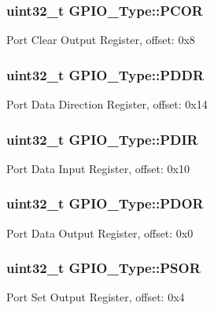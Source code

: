 \subsubsection[{\texorpdfstring{P\+C\+OR}{PCOR}}]{ uint32\+\_\+t G\+P\+I\+O\+\_\+\+Type\+::\+P\+C\+OR}\hypertarget{structGPIO__Type_a6c70e08238cd1fda316a11095b493719}{}\label{structGPIO__Type_a6c70e08238cd1fda316a11095b493719}
Port Clear Output Register, offset\+: 0x8 
\subsubsection[{\texorpdfstring{P\+D\+DR}{PDDR}}]{ uint32\+\_\+t G\+P\+I\+O\+\_\+\+Type\+::\+P\+D\+DR}\hypertarget{structGPIO__Type_a45c27e8ed0373953904b073c03bd1de5}{}\label{structGPIO__Type_a45c27e8ed0373953904b073c03bd1de5}
Port Data Direction Register, offset\+: 0x14 
\subsubsection[{\texorpdfstring{P\+D\+IR}{PDIR}}]{ uint32\+\_\+t G\+P\+I\+O\+\_\+\+Type\+::\+P\+D\+IR}\hypertarget{structGPIO__Type_a269fc0ec9450f3e86b2acddef2db7999}{}\label{structGPIO__Type_a269fc0ec9450f3e86b2acddef2db7999}
Port Data Input Register, offset\+: 0x10 
\subsubsection[{\texorpdfstring{P\+D\+OR}{PDOR}}]{ uint32\+\_\+t G\+P\+I\+O\+\_\+\+Type\+::\+P\+D\+OR}\hypertarget{structGPIO__Type_a361aec1ddf4e89774ea1d4a0fddd6ef4}{}\label{structGPIO__Type_a361aec1ddf4e89774ea1d4a0fddd6ef4}
Port Data Output Register, offset\+: 0x0 
\subsubsection[{\texorpdfstring{P\+S\+OR}{PSOR}}]{ uint32\+\_\+t G\+P\+I\+O\+\_\+\+Type\+::\+P\+S\+OR}\hypertarget{structGPIO__Type_a669ea2d1371abbcd552de208ea9230bc}{}\label{structGPIO__Type_a669ea2d1371abbcd552de208ea9230bc}
Port Set Output Register, offset\+: 0x4 
